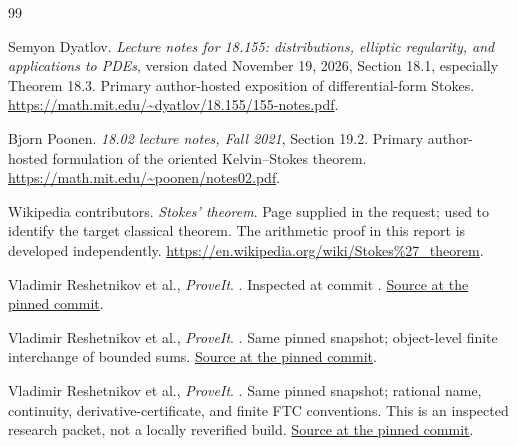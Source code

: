\clearpage
\begingroup\small
\begin{thebibliography}{99}

Semyon Dyatlov.
\emph{Lecture notes for 18.155: distributions, elliptic regularity,
and applications to PDEs}, version dated November 19, 2026,
Section 18.1, especially Theorem 18.3.
Primary author-hosted exposition of differential-form Stokes.
\url{https://math.mit.edu/~dyatlov/18.155/155-notes.pdf}.

Bjorn Poonen.
\emph{18.02 lecture notes, Fall 2021}, Section 19.2.
Primary author-hosted formulation of the oriented Kelvin--Stokes theorem.
\url{https://math.mit.edu/~poonen/notes02.pdf}.

Wikipedia contributors.
\emph{Stokes' theorem}. Page supplied in the request; used to identify
the target classical theorem. The arithmetic proof in this report is
developed independently.
\url{https://en.wikipedia.org/wiki/Stokes%27_theorem}.

Vladimir Reshetnikov et al., \emph{ProveIt}.
.
Inspected at commit \RepoCommit.
\href{https://github.com/VladimirReshetnikov/ProveIt/blob/a5688a1b37d62046c894691c3c41f7bdd53976ca/Logic/PrimitiveRecursiveArithmetic/Derivations/Lean/IPRADerivations/Analysis/FiniteFTC.lean}{Source at the pinned commit}.

Vladimir Reshetnikov et al., \emph{ProveIt}.
.
Same pinned snapshot; object-level finite interchange of bounded sums.
\href{https://github.com/VladimirReshetnikov/ProveIt/blob/a5688a1b37d62046c894691c3c41f7bdd53976ca/Logic/PrimitiveRecursiveArithmetic/Derivations/Lean/IPRADerivations/Core/Fubini.lean}{Source at the pinned commit}.

Vladimir Reshetnikov et al., \emph{ProveIt}.
.
Same pinned snapshot; rational name, continuity, derivative-certificate,
and finite FTC conventions. This is an inspected research packet,
not a locally reverified build.
\href{https://github.com/VladimirReshetnikov/ProveIt/blob/a5688a1b37d62046c894691c3c41f7bdd53976ca/Logic/PrimitiveRecursiveArithmetic/docs/proofs/analysis/calculus_ipra/report.tex}{Source at the pinned commit}.


\end{thebibliography}
